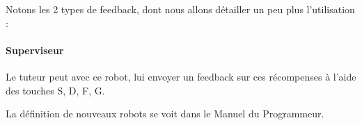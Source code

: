 \documentclass[a4paper,12pt]{article}
\begin{document}
  Notons les 2 types de feedback, dont nous allons détailler un peu plus l'utilisation :
  
  \paragraph{Superviseur} Le tuteur peut avec ce robot, lui envoyer un feedback sur ces récompenses
  à l'aide des touches S, D, F, G.
  
  La définition de nouveaux robots se voit dans le Manuel du Programmeur.
  



\end{document}
